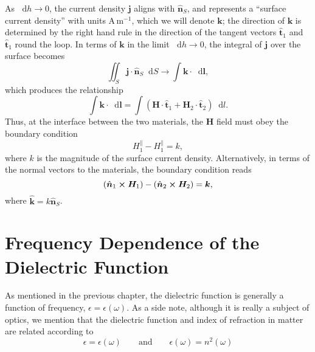 \documentclass[11pt, a4paper]{article}
\newcommand{\diff}{\mathop{}\!\mathrm{d}} %
\renewcommand{\vec}[1]{\bm{#1}} %
\newcommand{\uvec}[1]{\hat{\vec{#1}}} %
\renewcommand{\H}{\vec{H}}  %
\renewcommand{\j}{\vec{j}}  %
\begin{document}
\begin{itemize}
    As $ \diff h \to 0 $, the current density $ \j $ aligns with $ \uvec{n}_{S} $, and represents a ``surface current density'' with units $ \si{\ampere \, \meter^{-1}} $, which we will denote $ \vec{k} $; the direction of $ \vec{k} $ is determined by the right hand rule in the direction of the tangent vectors $ \uvec{t}_{1} $ and $ \uvec{t}_{1} $ round the loop. In terms of $ \vec{k} $ in the limit $ \diff h \to 0 $, the integral of $ \j $ over the surface becomes
    \begin{equation*}
        \iint_{S} \j \cdot \uvec{n}_{S} \diff S \to \int \vec{k} \cdot \diff \vec{l},
    \end{equation*}
    which produces the relationship
    \begin{equation*}
        \int \vec{k} \cdot \diff \vec{l} = \int (\H \cdot \uvec{t}_{1} + \H_{2}\cdot \uvec{t}_{2}) \diff l.
    \end{equation*}
    Thus, at the interface between the two materials, the $ \H $ field must obey the boundary condition 
	\begin{equation*}
        H_{1}^{\parallel} - H_{1}^{\parallel} = k,
	\end{equation*}
    where $ k $ is the magnitude of the surface current density. Alternatively, in terms of the normal vectors to the materials, the boundary condition reads
	\begin{equation*}
		(\uvec{n}_{1} \cross \H_{1}) - (\uvec{n}_{2}\cross \H_{2}) = \vec{k},
	\end{equation*}
    where $ \uvec{k} = k \uvec{n}_{S} $.
\end{itemize}

\newpage
\section{Frequency Dependence of the Dielectric Function}
As mentioned in the previous chapter, the dielectric function is generally a function of frequency, $ \epsilon = \epsilon(\omega) $. As a side note, although it is really a subject of optics, we mention that the dielectric function and index of refraction in matter are related according to
\begin{equation*}
    \epsilon = \epsilon(\omega) \qquad \text{and} \qquad \epsilon(\omega) = n^{2}(\omega)
\end{equation*}

    
\end{document}
